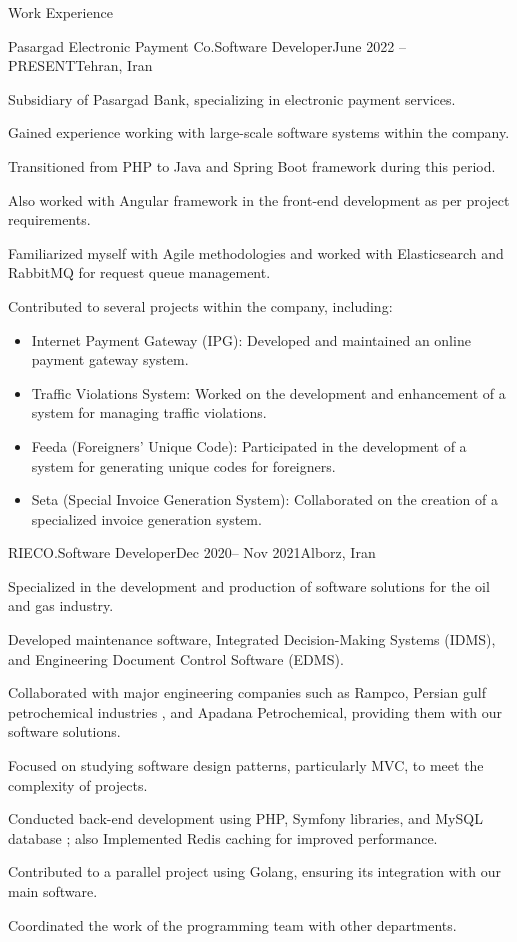 \documentclass[]{kyvernitis-resume}
\begin{document}
\begin{section}{Work Experience}
    \begin{subsection}{Pasargad Electronic Payment Co.}{Software Developer}{June 2022 -- PRESENT}{Tehran, Iran}
     		\item Subsidiary of Pasargad Bank, specializing in electronic payment services.
		\item Gained experience working with large-scale software systems within the company.
		\item Transitioned from PHP to Java and Spring Boot framework during this period.
		\item Also worked with Angular framework in the front-end development as per project requirements.
		\item Familiarized myself with Agile methodologies and worked with Elasticsearch and RabbitMQ for request queue management.
		\item Contributed to several projects within the company, including:
		
		\begin{itemize}[label={}, leftmargin=1cm]
		  \item Internet Payment Gateway (IPG): Developed and maintained an online payment gateway system.
		  \item Traffic Violations System: Worked on the development and enhancement of a system for managing traffic violations.
		  \item Feeda (Foreigners' Unique Code): Participated in the development of a system for generating unique codes for foreigners.
		  \item Seta (Special Invoice Generation System): Collaborated on the creation of a specialized invoice generation system.
		\end{itemize}

    \end{subsection}

 \begin{subsection}{RIECO.}{Software Developer}{Dec 2020-- Nov 2021}{Alborz, Iran}
       	\item Specialized in the development and production of software solutions for the oil and gas industry.
	\item Developed maintenance software, Integrated Decision-Making Systems (IDMS), and Engineering Document Control Software (EDMS).
	\item Collaborated with major engineering companies such as Rampco, Persian gulf petrochemical industries , and Apadana Petrochemical, providing them with our software solutions.
	\item Focused on studying software design patterns, particularly MVC, to meet the complexity of projects.
	\item Conducted back-end development using PHP, Symfony libraries, and MySQL database ; also Implemented Redis caching for improved performance.
	\item Contributed to a parallel project using Golang, ensuring its integration with our main software.
	\item Coordinated the work of the programming team with other departments.


\end{subsection}
\end{section}
\end{document}
